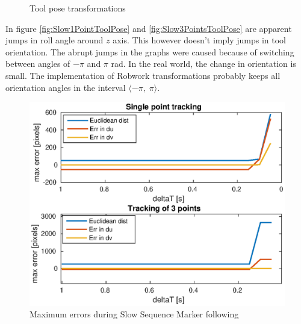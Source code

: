 \documentclass[]{scrartcl}
\begin{document}
\begin{figure}[!h]
	\hfill
	\caption{Tool pose transformations}
	\label{fig:SlowSequenceToolPose}
\end{figure}
In figure \ref{fig:Slow1PointToolPose} and \ref{fig:Slow3PointsToolPose} are apparent jumps in roll angle around $z$ axis. This however doesn't imply jumps in tool orientation. The abrupt jumps in the graphs were caused because of switching between angles of $-\pi$ and $\pi$ rad. In the real world, the change in orientation is small. The implementation of Robwork transformations probably keeps all orientation angles in the interval $ \langle -\pi, \; \pi \rangle $.

\vspace{0.5cm}
\begin{figure}
	\centering
	\includegraphics[width=0.7\linewidth]{fig/SlowSequence_errors.eps}
	\caption{Maximum errors during Slow Sequence Marker following}
	\label{fig:SlowSequence_errors}
\end{figure}
\end{document}
